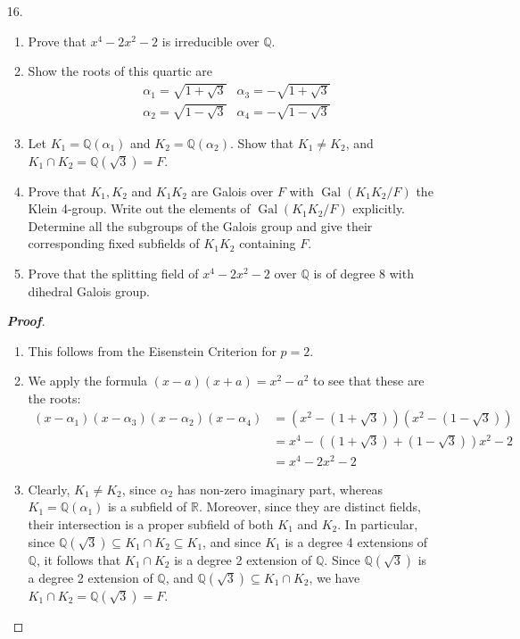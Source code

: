 \documentclass[12pt,leqno]{article}
\theoremstyle{definition}
\newcommand{\Gal}{\operatorname{Gal}}
\newcommand{\Q}{\mathbb{Q}}
\newcommand{\R}{\mathbb{R}}
\newenvironment{Proof}{\begin{proof}[\textnormal{\textbf{Proof}}]}{\end{proof}}
\begin{document}
\begin{enumerate}
   \item [16.]
    \begin{enumerate}
     \item Prove that $x^4-2x^2-2$ is irreducible over $\Q$.
     \item Show the roots of this quartic are\begin{align*}&\alpha_1=\sqrt{1+\sqrt{3}} &\alpha_3=-\sqrt{1+\sqrt{3}}\\&\alpha_2=\sqrt{1-\sqrt{3}} &\alpha_4=-\sqrt{1-\sqrt{3}}\end{align*}
     \item Let $K_1=\Q(\alpha_1)$ and $K_2=\Q(\alpha_2)$. Show that $K_1\not=K_2$, and $K_1\cap K_2=\Q(\sqrt{3})=F$.
     \item Prove that $K_1,K_2$ and $K_1K_2$ are Galois over $F$ with $\Gal(K_1K_2/F)$ the Klein 4-group. Write out the elements of $\Gal(K_1K_2/F)$ explicitly. Determine all the subgroups of the Galois group and give their corresponding fixed subfields of $K_1K_2$ containing $F$.
     \item Prove that the splitting field of $x^4-2x^2-2$ over $\Q$ is of degree 8 with dihedral Galois group.
    \end{enumerate}
    \begin{Proof}\indent
     \begin{enumerate}
      \item This follows from the Eisenstein Criterion for $p=2$.
      \item We apply the formula $(x-a)(x+a)=x^2-a^2$ to see that these are the roots:\begin{align*}(x-\alpha_1)(x-\alpha_3)(x-\alpha_2)(x-\alpha_4)&=(x^2-(1+\sqrt{3}))(x^2-(1-\sqrt{3}))\\&=x^4-\left((1+\sqrt{3})+(1-\sqrt{3})\right)x^2-2\\&=x^4-2x^2-2\end{align*}
      \item Clearly, $K_1\not=K_2$, since $\alpha_2$ has non-zero imaginary part, whereas $K_1=\Q(\alpha_1)$ is a subfield of $\R$. Moreover, since they are distinct fields, their intersection is a proper subfield of both $K_1$ and $K_2$. In particular, since $\Q(\sqrt{3})\subseteq K_1\cap K_2\subseteq K_1$, and since $K_1$ is a degree 4 extensions of $\Q$, it follows that $K_1\cap K_2$ is a degree 2 extension of $\Q$. Since $\Q(\sqrt{3})$ is a degree 2 extension of $\Q$, and $\Q(\sqrt{3})\subseteq K_1\cap K_2$, we have $K_1\cap K_2=\Q(\sqrt{3})=F$.

\end{enumerate}
\end{Proof}
\end{enumerate}
\end{document}
